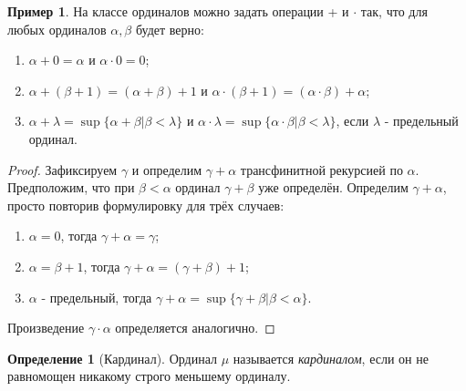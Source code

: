 \documentclass[a4paper]{article}
\theoremstyle{definition}
\newtheorem*{definition*}{Определение}
\newtheorem*{exmp}{Пример}
\begin{document}
\begin{enumerate}
       \begin{exmp}
        На классе ординалов можно задать операции + и $\cdot$ так, что для любых ординалов $ \alpha, \beta$ будет верно:
        \begin{enumerate}
         \item $\alpha + 0 = \alpha$ и $\alpha \cdot 0 = 0$;
         \item $\alpha + (\beta + 1) = (\alpha + \beta) + 1$ и $\alpha \cdot (\beta + 1) = (\alpha \cdot \beta) + \alpha$;
         \item $\alpha + \lambda = \sup\{ \alpha + \beta | \beta < \lambda\}$ и $\alpha \cdot \lambda = \sup\{\alpha \cdot \beta | \beta < \lambda\}$, если $\lambda$ - предельный ординал.
        \end{enumerate}
       \end{exmp}
       \begin{proof}
        Зафиксируем $\gamma$ и определим $\gamma + \alpha$ трансфинитной рекурсией по $\alpha$. Предположим, что при $\beta < \alpha$ ординал $\gamma + \beta$ уже определён. Определим $\gamma + \alpha$, просто повторив формулировку для трёх случаев:
        \begin{enumerate}
         \item $\alpha = 0$, тогда $\gamma + \alpha = \gamma$;
         \item $\alpha = \beta + 1$, тогда $\gamma + \alpha =  (\gamma + \beta) + 1$;
         \item $\alpha$ - предельный, тогда $\gamma + \alpha = \sup\{\gamma + \beta | \beta < \alpha\}$.
        \end{enumerate}
        Произведение $\gamma \cdot \alpha$ определяется аналогично.
       \end{proof}

       \begin{definition*}[Кардинал]
        Ординал $\mu$ называется \textit{кардиналом}, если он не равномощен никакому строго меньшему ординалу.
       \end{definition*}


\end{enumerate}
\end{document}
